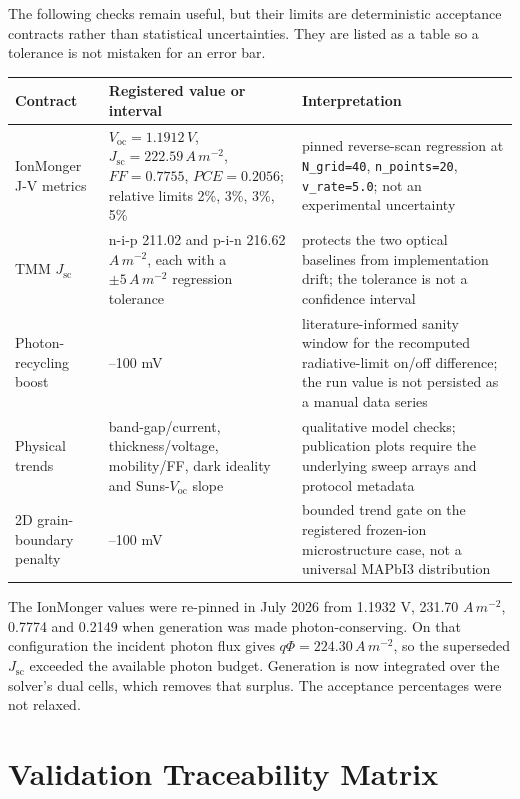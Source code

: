 \documentclass[
  11pt,
  american,
]{report}
\begin{document}
The following checks remain useful, but their limits are deterministic
acceptance contracts rather than statistical uncertainties. They are
listed as a table so a tolerance is not mistaken for an error bar.

\begin{longtable}[]{@{}
  >{\raggedright\arraybackslash}p{}
  >{\raggedright\arraybackslash}p{}
  >{\raggedright\arraybackslash}p{}@{}}
\toprule
Contract & Registered value or interval & Interpretation \\
\midrule
\endhead
IonMonger J-V metrics & \(V_\mathrm{oc}=1.1912\,V\),
\(J_\mathrm{sc}=222.59\,A\,m^{-2}\), \(FF=0.7755\), \(PCE=0.2056\);
relative limits 2\%, 3\%, 3\%, 5\% & pinned reverse-scan regression at
\texttt{N\_grid=40}, \texttt{n\_points=20}, \texttt{v\_rate=5.0}; not an
experimental uncertainty \\
TMM \(J_\mathrm{sc}\) & n-i-p 211.02 and p-i-n 216.62 \(A\,m^{-2}\),
each with a \(\pm5\,A\,m^{-2}\) regression tolerance & protects the two
optical baselines from implementation drift; the tolerance is not a
confidence interval \\
Photon-recycling boost & 40--100 mV & literature-informed sanity window
for the recomputed radiative-limit on/off difference; the run value is
not persisted as a manual data series \\
Physical trends & band-gap/current, thickness/voltage, mobility/FF, dark
ideality and Suns-\(V_\mathrm{oc}\) slope & qualitative model checks;
publication plots require the underlying sweep arrays and protocol
metadata \\
2D grain-boundary penalty & 5--100 mV & bounded trend gate on the
registered frozen-ion microstructure case, not a universal MAPbI3
distribution \\
\bottomrule
\end{longtable}

The IonMonger values were re-pinned in July 2026 from 1.1932 V, 231.70
\(A\,m^{-2}\), 0.7774 and 0.2149 when generation was made
photon-conserving. On that configuration the incident photon flux gives
\(q\Phi=224.30\,A\,m^{-2}\), so the superseded \(J_\mathrm{sc}\)
exceeded the available photon budget. Generation is now integrated over
the solver's dual cells, which removes that surplus. The acceptance
percentages were not relaxed.

\hypertarget{validation-traceability-matrix}{%
\section{Validation Traceability
Matrix}\label{validation-traceability-matrix}}
\end{document}
